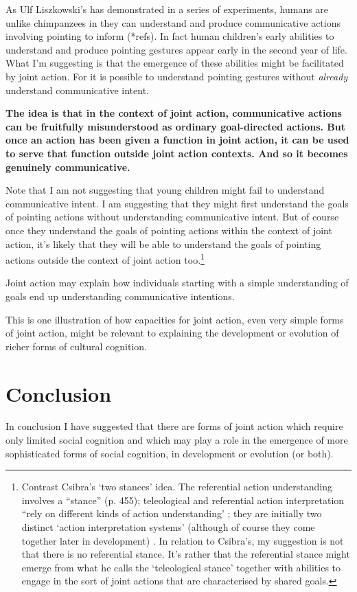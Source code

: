 \documentclass[12pt,a4paper]{extarticle}
\begin{document}
As Ulf Liszkowski's has demonstrated in a series of experiments, humans are unlike chimpanzees in they can understand and produce communicative actions involving pointing to inform (*refs).
In fact human children's early abilities to understand and produce pointing gestures appear early in the second year of life.
What I'm suggesting is that the emergence of these abilities might be facilitated by joint action.
For it is possible to understand pointing gestures without \emph{already} understand communicative intent.

\textbf{
The idea is that in the context of joint action, communicative actions can be fruitfully misunderstood as ordinary goal-directed actions.
But once an action has been given a function in joint action, it can be used to serve that function outside joint action contexts.  And so it becomes genuinely communicative.
}

Note that I am not suggesting that young children might fail to understand communicative intent.
I am suggesting that they might first understand the goals of pointing actions without understanding communicative intent.
But of course once they understand the goals of pointing actions within the context of joint action, it's likely that they will be able to understand the goals of pointing actions outside the context of joint action too.\footnote{
Contrast Csibra's `two stances' idea. The referential action understanding involves a “stance” (p. 455); teleological and referential action interpretation “rely on different kinds of action understanding' \citep[p.\ 456]{Csibra:2003kp}; they are initially two distinct `action interpretation systems' (although of course they come together later in development)  \citep[p.\ 456]{Csibra:2003kp}.
In relation to Csibra's, my suggestion is not that there is no referential stance.
It's rather that the referential stance might emerge from what he calls the `teleological stance' together with abilities to engage in the sort of joint actions that are characterised by shared goals.
}

Joint action may explain how individuals starting with a simple understanding of goals end up understanding communicative intentions.

This is one illustration of how capacities for joint action, even very simple forms of joint action, might be relevant to explaining the development or evolution of richer forms of cultural cognition.



\section{Conclusion}
In conclusion I have suggested that there are forms of joint action which require only limited social cognition and which may play a role in the emergence of more sophisticated forms of social cognition, in development or evolution (or both).
\end{document}
